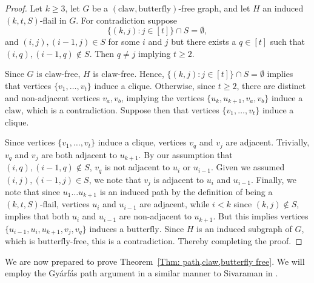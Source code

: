 \documentclass[12pt]{article}
\theoremstyle{definition}
\def\claw{\text{claw}}
\def\butterfly{\text{butterfly}}
\begin{document}
\begin{proof}
    Let $k\geq 3$, 
    let $G$ be a $(\claw,\butterfly)$-free graph, and let $H$ an induced $(k,t,S)$-flail in $G$.
    For contradiction suppose
    \[\{ (k,j): j \in [t]\} \cap S = \emptyset,\]
    and $(i,j),(i-1,j)\in S$ for some $i$ and $j$ but there exists a $q \in [t]$ such that $(i,q),(i-1,q)\notin S$.
    Then $q\neq j$ implying $t \geq 2$.

    Since $G$ is $\claw$-free, $H$ is $\claw$-free. 
    Hence, $\{ (k,j): j \in [t]\} \cap S = \emptyset$ implies that 
    vertices $\{v_1,\dots, v_t\}$ induce a clique.
    Otherwise, since $t\geq 2$, there are distinct and non-adjacent vertices $v_a,v_b$, 
    implying the vertices $\{u_k,u_{k+1},v_a,v_b\}$ induce a $\claw$, which is a contradiction.
    Suppose then that
    vertices $\{v_1,\dots, v_t\}$ induce a clique.

    Since
    vertices $\{v_1,\dots, v_t\}$ induce a clique, vertices $v_q$ and $v_j$ are adjacent.
    Trivially, $v_q$ and $v_j$ are both adjacent to $u_{k+1}$.
    By our assumption that $(i,q),(i-1,q)\notin S$, $v_q$ is not adjacent to $u_i$ or $u_{i-1}$.
    Given we assumed  $(i,j),(i-1,j)\in S$, we note that $v_j$ is adjacent to $u_i$ and $u_{i-1}$.
    Finally, we note that since $u_1\dots u_{k+1}$ is an induced path by the definition of being a $(k,t,S)$-flail,
    vertices $u_i$ and $u_{i-1}$ are adjacent, while $i < k$ since $(k,j)\notin S$, implies that both $u_i$ and $u_{i-1}$ are non-adjacent to $u_{k+1}$.
    But this implies vertices $\{u_{i-1},u_i,u_{k+1},v_j,v_q\}$ induces a $\butterfly$.
    Since $H$ is an induced subgraph of $G$, which is $\butterfly$-free, this is a contradiction.
    Thereby completing the proof.
\end{proof}



We are now prepared to prove Theorem~\ref{Thm: path,claw,butterfly free}.
We will employ the Gy\'arf\'as path argument in a similar manner to Sivaraman in \cite{sivaraman2019application}.
\end{document}
